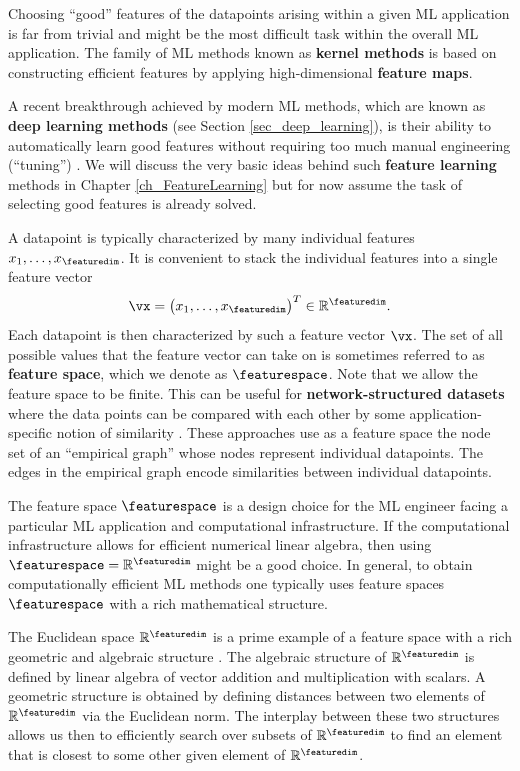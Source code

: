 \documentclass[12pt]{report}
\newcommand{\featurelen}{\featuredim}
\begin{document}
Choosing ``good'' features of the datapoints arising within a given ML application 
is far from trivial and might be the most difficult task within the overall ML application. 
The family of ML methods known as {\bf kernel methods} \cite{LampertNowKernel} 
is based on constructing efficient features by applying high-dimensional {\bf feature maps}. 

A recent breakthrough achieved by modern ML methods, which are known as 
{\bf deep learning methods} (see Section \ref{sec_deep_learning}), is their ability 
to automatically learn good features without requiring too much manual engineering 
(``tuning'') \cite{Goodfellow-et-al-2016}. We will discuss the very basic ideas behind 
such {\bf feature learning} methods in Chapter \ref{ch_FeatureLearning} but for now 
assume the task of selecting good features is already solved. 

A datapoint is typically characterized by many individual features  $x_{1},\ldots,x_{\featuredim}$. 
It is convenient to stack the individual features into a single feature vector 
\begin{equation}
\nonumber 
\vx=\big(x_{1},\ldots,x_{\featuredim}\big)^{T} \in \mathbb{R}^{\featuredim}. 
\end{equation}
Each datapoint is then characterized by such a feature vector $\vx$. The set of 
all possible values that the feature vector can take on is sometimes referred to 
as {\bf feature space}, which we denote as $\featurespace$. Note that we 
allow the feature space to be finite. This can be useful for {\bf network-structured datasets} 
where the data points can be compared with each other by some application-specific 
notion of similarity \cite{WhenIsNLASSO,NNSPFrontiers2018,LogisticNLasso,JungTVMin2019}. 
These approaches use as a feature space the node set of an ``empirical graph'' whose 
nodes represent individual datapoints. The edges in the empirical graph encode 
similarities between individual datapoints. 

The feature space $\featurespace$ is a design choice for the ML engineer facing a 
particular ML application and computational infrastructure. If the computational 
infrastructure allows for efficient numerical linear algebra, then using $\featurespace = \mathbb{R}^{\featurelen}$ 
might be a good choice. In general, to obtain computationally efficient ML methods 
one typically uses feature spaces $\featurespace$ with a rich mathematical structure.
 
The Euclidean space $\mathbb{R}^{\featuredim}$ is a prime example of a feature space 
with a rich geometric and algebraic structure \cite{RudinBookPrinciplesMatheAnalysis}. 
The algebraic structure of $\mathbb{R}^{\featuredim}$ is defined by linear algebra of vector 
addition and multiplication with scalars. A geometric structure is obtained by defining 
distances between two elements of $\mathbb{R}^{\featuredim}$ via the Euclidean norm. 
The interplay between these two structures allows us then to efficiently search 
over subsets of $\mathbb{R}^{\featuredim}$ to find an element that is closest to 
some other given element of $\mathbb{R}^{\featurelen}$. 
\end{document}

